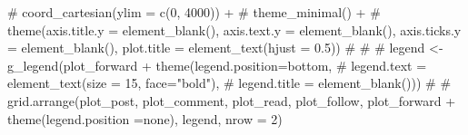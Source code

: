 \documentclass[
  letterpaper,
  DIV=11,
  numbers=noendperiod]{scrartcl}
\newenvironment{Shaded}{\begin{snugshade}}{\end{snugshade}}
\newcommand{\CommentTok}[1]{\textcolor[rgb]{0.37,0.37,0.37}{#1}}
\begin{document}
\begin{Shaded}
\begin{Highlighting}[]
\CommentTok{\#   coord\_cartesian(ylim = c(0, 4000)) +}
\CommentTok{\#   theme\_minimal() +}
\CommentTok{\#   theme(axis.title.y = element\_blank(), axis.text.y = element\_blank(), axis.ticks.y = element\_blank(), plot.title = element\_text(hjust = 0.5)) }
\CommentTok{\# }
\CommentTok{\# }
\CommentTok{\# legend \textless{}{-} g\_legend(plot\_forward + theme(legend.position=\textquotesingle{}bottom\textquotesingle{}, }
\CommentTok{\#                                         legend.text = element\_text(size = 15, face="bold"), }
\CommentTok{\#                                         legend.title = element\_blank()))}
\CommentTok{\# }
\CommentTok{\# grid.arrange(plot\_post, plot\_comment, plot\_read, plot\_follow, plot\_forward + theme(legend.position =\textquotesingle{}none\textquotesingle{}), legend, nrow = 2)}
\end{Highlighting}
\end{Shaded}
\end{document}
